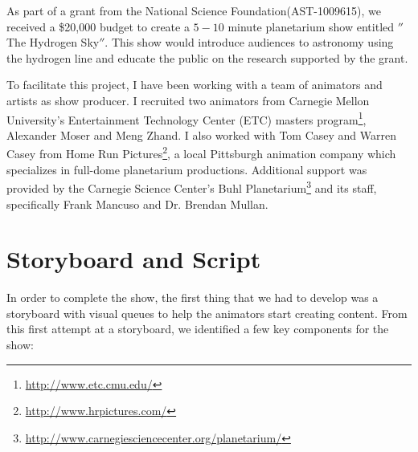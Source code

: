 As part of a grant from the National Science Foundation(AST-1009615), we received a \$20,000 budget to create a $5-10$ minute planetarium show entitled $''$The Hydrogen Sky$''$. This show would introduce audiences to astronomy using the \cm hydrogen line and educate the public on the research supported by the grant. 

To facilitate this project, I have been working with a team of animators and artists as show producer. I recruited two animators from Carnegie Mellon University's Entertainment Technology Center (ETC) masters program\footnote{\url{http://www.etc.cmu.edu/}}, Alexander Moser and Meng Zhand. I also worked with Tom Casey and Warren Casey from Home Run Pictures\footnote{\url{http://www.hrpictures.com/}}, a local Pittsburgh animation company which specializes in full-dome planetarium productions. Additional support was provided by the Carnegie Science Center's Buhl Planetarium\footnote{\url{http://www.carnegiesciencecenter.org/planetarium/}} and its staff, specifically Frank Mancuso and Dr. Brendan Mullan.



\section{Storyboard and Script}

In order to complete the show, the first thing that we had to develop was a storyboard with visual queues to help the animators start creating content. From this first attempt at a storyboard, we identified a few key components for the show:

